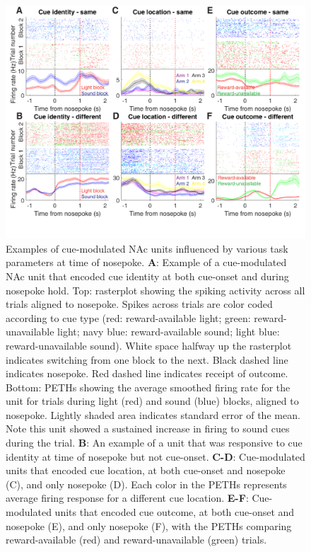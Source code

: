 \documentclass[11pt]{article}
\newcommand{\bsf}[1]{\textbf{#1}}
\begin{document}
 \begin{figure}[ht!]
\centering
\includegraphics[width=\textwidth]{Fig 8 - NP Neural examples.pdf}
\caption{Examples of cue-modulated NAc units influenced by various task
parameters at time of nosepoke. \bsf{A}: Example of a cue-modulated NAc unit
that encoded cue identity at both cue-onset and during nosepoke hold. Top:
rasterplot showing the spiking activity across all trials aligned to
nosepoke. Spikes across trials are color coded according to cue type (red:
reward-available light; green: reward-unavailable light; navy blue:
reward-available sound; light blue: reward-unavailable sound). White space
halfway up the rasterplot indicates switching from one block to the
next. Black dashed line indicates nosepoke. Red dashed line indicates receipt
of outcome. Bottom: PETHs showing the average smoothed firing rate for the
unit for trials during light (red) and sound (blue) blocks, aligned to
nosepoke. Lightly shaded area indicates standard error of the mean. Note this
unit showed a sustained increase in firing to sound cues during the trial. \bsf{B}: An
example of a unit that was responsive to cue identity at time of nosepoke but
not cue-onset. \bsf{C-D}: Cue-modulated units that encoded cue location, at
both cue-onset and nosepoke (C), and only nosepoke (D). Each color in the
PETHs represents average firing response for a different cue
location. \bsf{E-F}: Cue-modulated units that encoded cue outcome, at both
cue-onset and nosepoke (E), and only nosepoke (F), with the PETHs comparing
reward-available (red) and reward-unavailable (green) trials.}
\label{fig:NP_examples}
\end{figure} \clearpage
\end{document}
